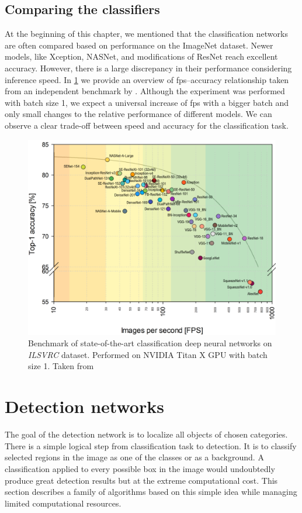 \subsection{Comparing the classifiers}
\label{sec:cnncomp}
At the beginning of this chapter, we mentioned that the classification networks are often compared based on performance on the ImageNet dataset. Newer models, like Xception, NASNet, and modifications of ResNet reach excellent accuracy. However, there is a large discrepancy in their performance considering inference speed. In \cref{fig:cnnbenchmark} we provide an overview of fps--accuracy relationship taken from an independent benchmark by \citeauthor{bib:cnnbenchmark} \cite{bib:cnnbenchmark}. Although the experiment was performed with batch size 1, we expect a universal increase of fps with a bigger batch and only small changes to the relative performance of different models. We can observe a clear trade-off between speed and accuracy for the classification task.

\begin{figure}
    \includegraphics[width=\textwidth]{img/fps_comp}
    \caption[Benchmark of classification CNNs]%
    {Benchmark of state-of-the-art classification deep neural networks on \textit{ILSVRC} dataset. Performed on NVIDIA
Titan X GPU with batch size 1. Taken from \cite[fig. 3]{bib:cnnbenchmark}}
    \label{fig:cnnbenchmark}
\end{figure}



\section{Detection networks}
\label{sec:detnets}
The goal of the detection network is to localize all objects of chosen categories. There is a simple logical step from classification task to detection. It is to classify selected regions in the image as one of the classes or as a background. A classification applied to every possible box in the image would undoubtedly produce great detection results but at the extreme computational cost. This section describes a family of algorithms based on this simple idea while managing limited computational resources.

